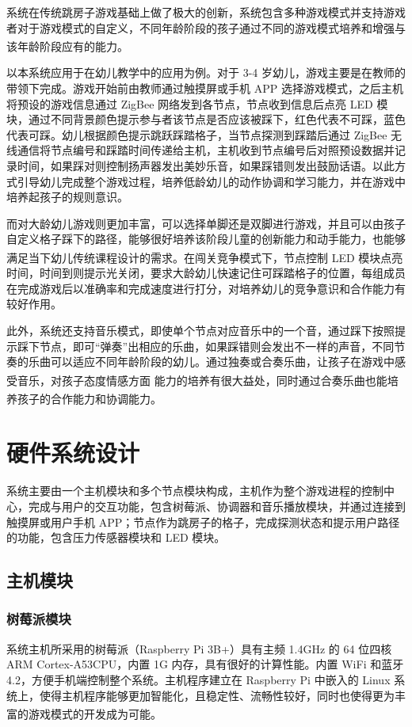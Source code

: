 \documentclass[a4paper,11pt,onecolumn,twoside]{article}
\newcommand{\supercite}[1]{\textsuperscript{\cite{#1}}}
\begin{document}
\begin{spacing}{1.2}
   系统在传统跳房子游戏基础上做了极大的创新，系统包含多种游戏模式并支持游戏者对于游戏模式的自定义，不同年龄阶段的孩子通过不同的游戏模式培养和增强与该年龄阶段应有的能力\supercite{5}。

    以本系统应用于在幼儿教学中的应用为例。对于 3-4 岁幼儿，游戏主要是在教师的带领下完成。游戏开始前由教师通过触摸屏或手机 APP 选择游戏模式，之后主机将预设的游戏信息通过 ZigBee 网络发到各节点，节点收到信息后点亮 LED 模块，通过不同背景颜色提示参与者该节点是否应该被踩下，红色代表不可踩，蓝色代表可踩。幼儿根据颜色提示跳跃踩踏格子，当节点探测到踩踏后通过 ZigBee 无线通信将节点编号和踩踏时间传递给主机，主机收到节点编号后对照预设数据并记录时间，如果踩对则控制扬声器发出美妙乐音，如果踩错则发出鼓励话语。以此方式引导幼儿完成整个游戏过程，培养低龄幼儿的动作协调和学习能力，并在游戏中培养起孩子的规则意识。

    而对大龄幼儿游戏则更加丰富，可以选择单脚还是双脚进行游戏，并且可以由孩子自定义格子踩下的路径，能够很好培养该阶段儿童的创新能力和动手能力，也能够满足当下幼儿传统课程设计的需求\supercite{4}。在闯关竞争模式下，节点控制 LED 模块点亮时间，时间到则提示光关闭，要求大龄幼儿快速记住可踩踏格子的位置，每组成员在完成游戏后以准确率和完成速度进行打分，对培养幼儿的竞争意识和合作能力有较好作用。

    此外，系统还支持音乐模式，即使单个节点对应音乐中的一个音，通过踩下按照提示踩下节点，即可“弹奏”出相应的乐曲，如果踩错则会发出不一样的声音，不同节奏的乐曲可以适应不同年龄阶段的幼儿。通过独奏或合奏乐曲，让孩子在游戏中感受音乐，对孩子态度情感方面\supercite{9} 能力的培养有很大益处，同时通过合奏乐曲也能培养孩子的合作能力和协调能力\supercite{11}。

\section{硬件系统设计}
    系统主要由一个主机模块和多个节点模块构成，主机作为整个游戏进程的控制中心，完成与用户的交互功能，包含树莓派、协调器和音乐播放模块，并通过连接到触摸屏或用户手机 APP；节点作为跳房子的格子，完成探测状态和提示用户路径的功能，包含压力传感器模块和 LED 模块。

    \subsection{主机模块}
    \subsubsection{树莓派模块}
    系统主机所采用的树莓派（Raspberry Pi 3B+）具有主频 1.4GHz 的 64 位四核 ARM Cortex-A53CPU，内置 1G 内存，具有很好的计算性能。内置 WiFi 和蓝牙 4.2，方便手机端控制整个系统。主机程序建立在 Raspberry Pi 中嵌入的 Linux 系统上，使得主机程序能够更加智能化，且稳定性、流畅性较好，同时也使得更为丰富的游戏模式的开发成为可能\supercite{12}。


\end{spacing}
\end{document}
